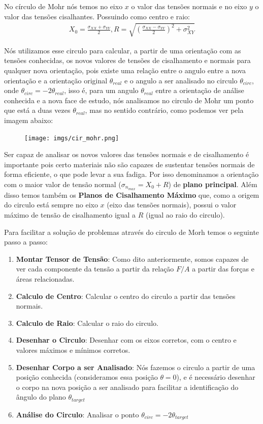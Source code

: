\documentclass{article}
\begin{document}
No círculo de Mohr nós temos no eixo $x$ o valor das tensões normais e no eixo $y$ o valor das tensões cisalhantes. Possuindo como centro e raio:
\begin{align*}
    X_0 = \frac{\sigma_{XX} + \sigma_{YY}}{2}, R = \sqrt{\left(\frac{\sigma_{XX} - \sigma_{YY}}{2}\right)^2 + \sigma^2_{XY}}
\end{align*}

Nós utilizamos esse circulo para calcular, a partir de uma orientação com as tensões conhecidas, os novos valores de tensões de cisalhamento e normais para qualquer nova orientação, pois existe uma relação entre o angulo entre a nova orientação e a orientação original $\theta_{real}$ e o angulo a ser analisado no circulo $\theta_{circ}$, onde $\theta_{circ} = -2\theta_{real}$, isso é, para um angulo $\theta_{real}$ entre a orientação de análise conhecida e a nova face de estudo, nós analisamos no circulo de Mohr um ponto que está a duas vezes $\theta_{real}$, mas no sentido contrário, como podemos ver pela imagem abaixo:
\begin{figure}[h]
    \centering
    \texttt{[image: imgs/cir\_mohr.png]}
\end{figure}

Ser capaz de analisar os novos valores das tensões normais e de cisalhamento é importante pois certo materiais não são capazes de sustentar tensões normais de forma eficiente, o que pode levar a sua fadiga. Por isso denominamos a orientação com o maior valor de tensão normal ($ \sigma_{n_{max}} = X_0 + R$) de \textbf{plano principal}. Além disso temos também os \textbf{Planos de Cisalhamento Máximo} que, como a origem do circulo está sempre no eixo $x$ (eixo das tensões normais), possui o valor máximo de tensão de cisalhamento igual a $R$ (igual ao raio do circulo).

Para facilitar a solução de problemas através do circulo de Morh temos o seguinte passo a passo:
\begin{enumerate}
    \item \textbf{Montar Tensor de Tensão}: Como dito anteriormente, somos capazes de ver cada componente da tensão a partir da relação $F/A$ a partir das forças e áreas relacionadas.
    \item \textbf{Calculo de Centro}: Calcular o centro do circulo a partir das tensões normais.
    \item \textbf{Calculo de Raio}: Calcular o raio do circulo.
    \item \textbf{Desenhar o Circulo}: Desenhar com os eixos corretos, com o centro e valores máximos e mínimos corretos.
    \item \textbf{Desenhar Corpo a ser Analisado}: Nós fazemos o circulo a partir de uma posição conhecida (consideramos essa posição $\theta=0$), e é necessário desenhar o corpo na nova posição a ser analisado para facilitar a identificação do ângulo do plano $\theta_{target}$
    \item \textbf{Análise do Circulo}: Analisar o ponto $\theta_{circ} = -2 \theta_{target}$
\end{enumerate}
\end{document}
